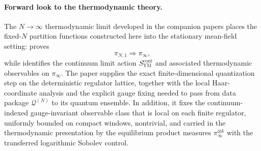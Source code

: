 \documentclass[11pt]{article}
\theoremstyle{remark}
\begin{document}
\paragraph{Forward look to the thermodynamic theory.}
The $N\to\infty$ thermodynamic limit developed in the companion papers places
the fixed-$N$ partition functions constructed here into the stationary
mean-field setting: \cite{convergence} proves
\[
\pi_{N,1}\Rightarrow \pi_\infty,
\]
while \cite{continuumqft} identifies the continuum limit action
$S_{\mathrm{YM}}^{\mathrm{cont}}$ and associated thermodynamic observables on
$\pi_\infty$.  The paper supplies the exact finite-dimensional
quantization step on the deterministic regulator lattice, together with the
local Haar-coordinate analysis and the explicit gauge fixing needed to pass from
data package $\mathcal Q^{(N)}$ to its quantum ensemble.  In addition, it fixes
the continuum-indexed gauge-invariant observable class that is local on each
finite regulator, uniformly bounded on compact windows, nontrivial, and carried
in the thermodynamic presentation by the equilibrium product measures
\(\pi_\infty^{\otimes k}\) with the transferred logarithmic Sobolev control.



\end{document}
